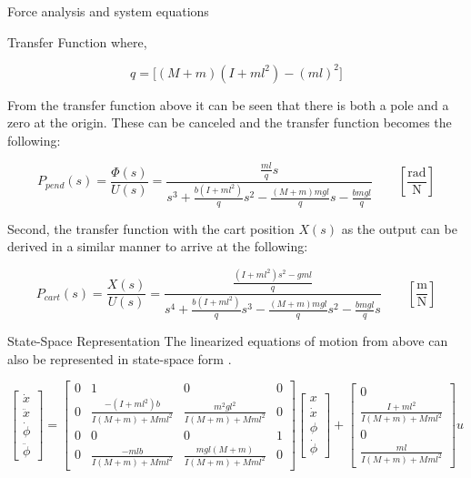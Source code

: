 \begin{frame}{Force analysis and system equations}
\begin{block}{Transfer Function}
where,

\begin{equation}
q = \big[(M+m)(I+ml^2) - (ml)^2\big]
\end{equation}

From the transfer function above it can be seen that there is both a
pole and a zero at the origin. These can be canceled and the transfer
function becomes the following:

\begin{equation}
P_{pend}(s) = \frac{\Phi(s)}{U(s)} = 
\frac{\tfrac{ml}{q}s}{s^3 + \tfrac{b(I+ml^2)}{q}s^2 - \tfrac{(M+m)mgl}{q}s - \tfrac{bmgl}{q}}
\qquad \left[\frac{\text{rad}}{\text{N}}\right]
\end{equation}

Second, the transfer function with the cart position \(X(s)\) as the
output can be derived in a similar manner to arrive at the following:

\begin{equation}
P_{cart}(s) = \frac{X(s)}{U(s)} = 
\frac{ \tfrac{ (I+ml^2)s^2 - gml } {q}}
{s^4 + \tfrac{b(I+ml^2)}{q}s^3 - \tfrac{(M+m)mgl}{q}s^2 - \tfrac{bmgl}{q}s}
\qquad \left[\frac{\text{m}}{\text{N}}\right]
\end{equation}
\end{block}

\begin{block}{State-Space Representation}
\protect{}\label{state-space-representation}
The linearized equations of motion from above can also be represented in
state-space form .

\begin{equation}
\begin{bmatrix}
  \dot{x}\\
  \ddot{x}\\
  \dot{\phi}\\
  \ddot{\phi}
\end{bmatrix}
=
\begin{bmatrix}
  0 & 1 & 0 & 0 \\
  0 & \tfrac{-(I+ml^2)b}{I(M+m)+Mml^2} & \tfrac{m^2gl^2}{I(M+m)+Mml^2} & 0 \\
  0 & 0 & 0 & 1 \\
  0 & \tfrac{-mlb}{I(M+m)+Mml^2} & \tfrac{mgl(M+m)}{I(M+m)+Mml^2} & 0
\end{bmatrix}
\begin{bmatrix}
  x \\
  \dot{x} \\
  \phi \\
  \dot{\phi}
\end{bmatrix}
+
\begin{bmatrix}
  0 \\
  \tfrac{I+ml^2}{I(M+m)+Mml^2} \\
  0 \\
  \tfrac{ml}{I(M+m)+Mml^2}
\end{bmatrix} u
\end{equation}


\end{block}
\end{frame}
